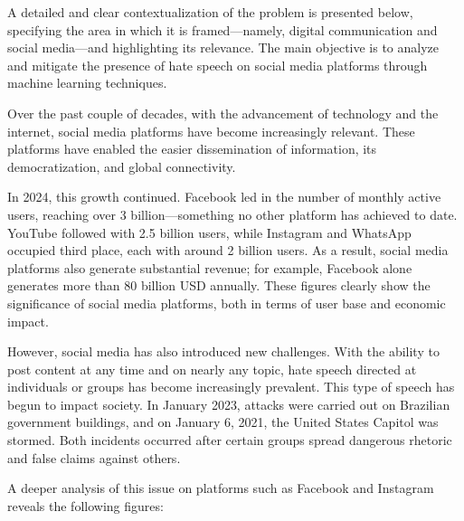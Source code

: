 A detailed and clear contextualization of the problem is presented below, specifying the area in which it is framed—namely, digital communication and social media—and highlighting its relevance. The main objective is to analyze and mitigate the presence of hate speech on social media platforms through machine learning techniques.

Over the past couple of decades, with the advancement of technology and the internet, social media platforms have become increasingly relevant. These platforms have enabled the easier dissemination of information, its democratization, and global connectivity.

In 2024, this growth continued. Facebook led in the number of monthly active users, reaching over 3 billion—something no other platform has achieved to date. YouTube followed with 2.5 billion users, while Instagram and WhatsApp occupied third place, each with around 2 billion users. As a result, social media platforms also generate substantial revenue; for example, Facebook alone generates more than 80 billion USD annually. These figures clearly show the significance of social media platforms, both in terms of user base and economic impact.

However, social media has also introduced new challenges. With the ability to post content at any time and on nearly any topic, hate speech directed at individuals or groups has become increasingly prevalent. This type of speech has begun to impact society. In January 2023, attacks were carried out on Brazilian government buildings, and on January 6, 2021, the United States Capitol was stormed. Both incidents occurred after certain groups spread dangerous rhetoric and false claims against others.

A deeper analysis of this issue on platforms such as Facebook and Instagram reveals the following figures:

